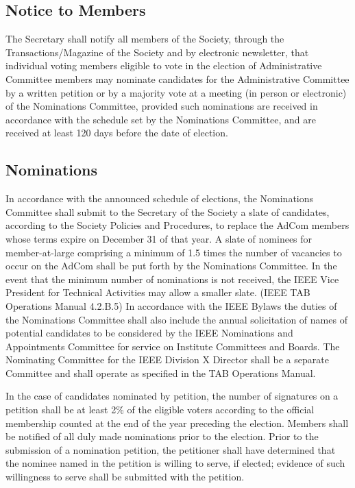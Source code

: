 \documentclass[10pt]{article}
\begin{document}
\subsection{Notice to Members}

The Secretary shall notify all members of the Society, through the Transactions/Magazine of the Society and by electronic newsletter, that individual voting members eligible to vote in the election of Administrative Committee members may nominate candidates for the Administrative Committee by a written petition or by a majority vote at a meeting (in person or electronic) of the Nominations Committee, provided such nominations are received in accordance with the schedule set by the Nominations Committee, and are received at least 120 days before the date of election. 


\subsection{Nominations}
In accordance with the announced schedule of elections, the Nominations Committee shall submit to the Secretary of the Society a slate of candidates, according to the Society Policies and Procedures, to replace the AdCom members whose terms expire on December 31 of that year. A slate of nominees for member-at-large comprising a minimum of 1.5 times the number of vacancies to occur on the AdCom shall be put forth by the Nominations Committee. In the event that the minimum number of nominations is not received, the IEEE Vice President for Technical Activities may allow a smaller slate. (IEEE TAB Operations Manual 4.2.B.5) In accordance with the IEEE Bylaws the duties of the Nominations Committee shall also include the annual solicitation of names of potential candidates to be considered by the IEEE Nominations and Appointments Committee for service on Institute Committees and Boards. The Nominating Committee for the IEEE Division X Director shall be a separate Committee and shall operate as specified in the TAB Operations Manual.

In the case of candidates nominated by petition, the number of signatures on a petition shall be at least 2\% of the eligible voters according to the official membership counted at the end of the year preceding the election. Members shall be notified of all duly made nominations prior to the election.  Prior to the submission of a nomination petition, the petitioner shall have determined that the nominee named in the petition is willing to serve, if elected; evidence of such willingness to serve shall be submitted with the petition. 
\end{document}
